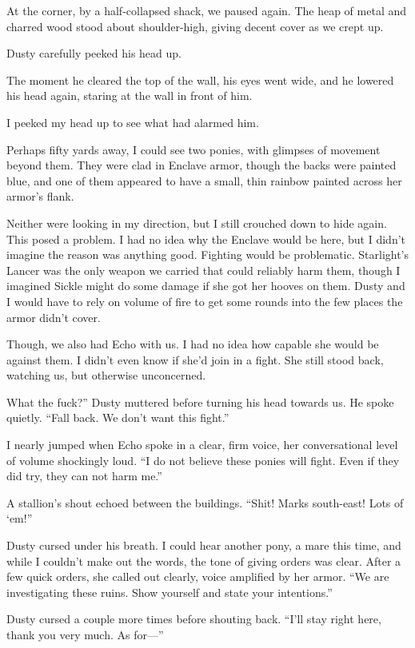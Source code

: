 At the corner, by a half-collapsed shack, we paused again. The heap of metal and charred wood stood about shoulder-high, giving decent cover as we crept up.

Dusty carefully peeked his head up.

The moment he cleared the top of the wall, his eyes went wide, and he lowered his head again, staring at the wall in front of him.

I peeked my head up to see what had alarmed him.

Perhaps fifty yards away, I could see two ponies, with glimpses of movement beyond them. They were clad in Enclave armor, though the backs were painted blue, and one of them appeared to have a small, thin rainbow painted across her armor’s flank.

Neither were looking in my direction, but I still crouched down to hide again. This posed a problem. I had no idea why the Enclave would be here, but I didn’t imagine the reason was anything good. Fighting would be problematic. Starlight’s Lancer was the only weapon we carried that could reliably harm them, though I imagined Sickle might do some damage if she got her hooves on them. Dusty and I would have to rely on volume of fire to get some rounds into the few places the armor didn’t cover.

Though, we also had Echo with us. I had no idea how capable she would be against them. I didn’t even know if she’d join in a fight. She still stood back, watching us, but otherwise unconcerned.

\leavevmode{}What the fuck?” Dusty muttered before turning his head towards us. He spoke quietly. “Fall back. We don’t want this fight.”

I nearly jumped when Echo spoke in a clear, firm voice, her conversational level of volume shockingly loud. “I do not believe these ponies will fight. Even if they did try, they can not harm me.”

A stallion’s shout echoed between the buildings. “Shit! Marks south-east! Lots of ‘em!”

Dusty cursed under his breath. I could hear another pony, a mare this time, and while I couldn’t make out the words, the tone of giving orders was clear. After a few quick orders, she called out clearly, voice amplified by her armor. “We are investigating these ruins. Show yourself and state your intentions.”

Dusty cursed a couple more times before shouting back. “I’ll stay right here, thank you very much. As for—”

